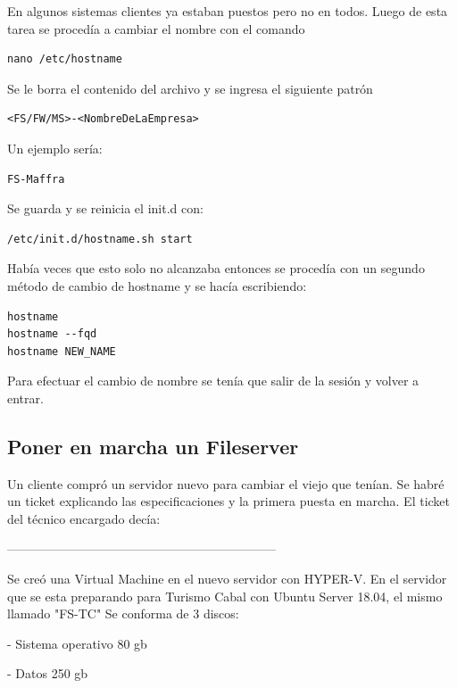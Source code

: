 \documentclass[12pt,a4paper]{article}
\begin{document}
En algunos sistemas clientes ya estaban puestos pero no en todos. Luego de esta tarea se procedía a cambiar el nombre con el comando

\begin{lstlisting}
nano /etc/hostname
\end{lstlisting}

Se le borra el contenido del archivo y se ingresa el siguiente patrón

\begin{lstlisting}
<FS/FW/MS>-<NombreDeLaEmpresa>
\end{lstlisting}

Un ejemplo sería:

\begin{lstlisting}
FS-Maffra
\end{lstlisting}

Se guarda y se reinicia el init.d con:

\begin{lstlisting}
/etc/init.d/hostname.sh start
\end{lstlisting}

Había veces que esto solo no alcanzaba entonces se procedía con un segundo método de cambio de hostname y se hacía escribiendo:

\begin{lstlisting}
hostname
hostname --fqd
hostname NEW_NAME
\end{lstlisting}

Para efectuar el cambio de nombre se tenía que salir de la sesión y volver a entrar.

\subsection{Poner en marcha un Fileserver}
Un cliente compró un servidor nuevo para cambiar el viejo que tenían. Se habré un ticket explicando las especificaciones y la primera puesta en marcha. El ticket del técnico encargado decía: 

\begin{center}
-----------------------------------------------------------------
\end{center}

Se creó una Virtual Machine en el nuevo servidor con HYPER-V. En el servidor que se esta preparando para Turismo Cabal con Ubuntu Server 18.04, el mismo llamado "FS-TC" Se conforma de 3 discos:

- Sistema operativo 80 gb 

- Datos 250 gb 
\end{document}
